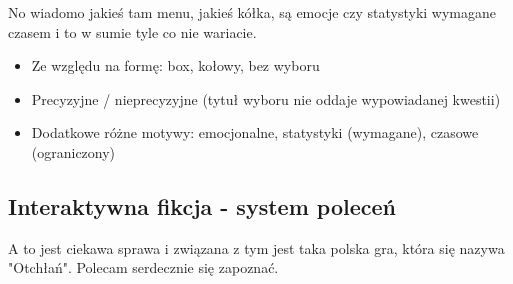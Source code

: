 No wiadomo jakieś tam menu, jakieś kółka, są emocje czy statystyki wymagane czasem i to w sumie
tyle co nie wariacie.

\begin{itemize}
	\item Ze względu na formę: box, kołowy, bez wyboru
	\item Precyzyjne / nieprecyzyjne (tytuł wyboru nie oddaje wypowiadanej kwestii)
	\item Dodatkowe różne motywy: emocjonalne, statystyki (wymagane), czasowe (ograniczony)
\end{itemize}

\subsection{Interaktywna fikcja - system poleceń}\label{subsection:ch1_3_2}

A to jest ciekawa sprawa i związana z tym jest taka polska gra, która się nazywa "Otchłań".
Polecam serdecznie się zapoznać.